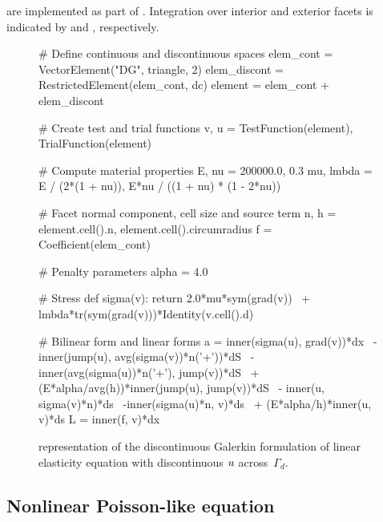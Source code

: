 are implemented as part of \ufl{}. Integration over interior and exterior
facets is indicated by  and , respectively.
%
\begin{figure}
\begin{python}
# Define continuous and discontinuous spaces
elem_cont    = VectorElement("DG", triangle, 2)
elem_discont = RestrictedElement(elem_cont, dc)
element      = elem_cont + elem_discont

# Create test and trial functions
v, u = TestFunction(element), TrialFunction(element)

# Compute material properties
E, nu     = 200000.0, 0.3
mu, lmbda = E / (2*(1 + nu)), E*nu / ((1 + nu) * (1 - 2*nu))

# Facet normal component, cell size and source term
n, h = element.cell().n, element.cell().circumradius
f = Coefficient(elem_cont)

# Penalty parameters
alpha = 4.0

# Stress
def sigma(v):
   return 2.0*mu*sym(grad(v)) \
  + lmbda*tr(sym(grad(v)))*Identity(v.cell().d)

# Bilinear form and linear forms
a = inner(sigma(u), grad(v))*dx \
  - inner(jump(u), avg(sigma(v))*n('+'))*dS \
  - inner(avg(sigma(u))*n('+'), jump(v))*dS \
  + (E*alpha/avg(h))*inner(jump(u), jump(v))*dS \
  - inner(u, sigma(v)*n)*ds \
  -inner(sigma(u)*n, v)*ds \
  + (E*alpha/h)*inner(u, v)*ds
L = inner(f, v)*dx
\end{python}
\caption{{\ufl} representation of the discontinuous Galerkin formulation of
linear elasticity equation with discontinuous $u$ across~$\Gamma_{d}$.}
\label{code:nikbakht:dg-elasticity}
\end{figure}
\subsection{Nonlinear Poisson-like equation}

